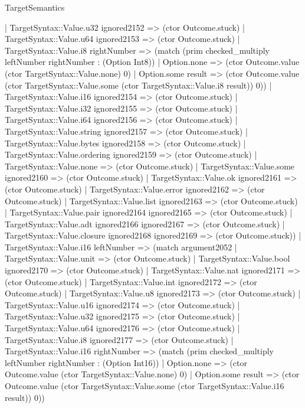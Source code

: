 \begin{lexlean}{TargetSemantics}
\begin{semanticmodule}
{              | TargetSyntax::Value.u32 ignored2152 => (ctor Outcome.stuck)
              | TargetSyntax::Value.u64 ignored2153 => (ctor Outcome.stuck)
              | TargetSyntax::Value.i8 rightNumber => (match (prim checked_multiply leftNumber rightNumber : (Option Int8))
                | Option.none => (ctor Outcome.value (ctor TargetSyntax::Value.none) 0)
                | Option.some result => (ctor Outcome.value (ctor TargetSyntax::Value.some (ctor TargetSyntax::Value.i8 result)) 0))
              | TargetSyntax::Value.i16 ignored2154 => (ctor Outcome.stuck)
              | TargetSyntax::Value.i32 ignored2155 => (ctor Outcome.stuck)
              | TargetSyntax::Value.i64 ignored2156 => (ctor Outcome.stuck)
              | TargetSyntax::Value.string ignored2157 => (ctor Outcome.stuck)
              | TargetSyntax::Value.bytes ignored2158 => (ctor Outcome.stuck)
              | TargetSyntax::Value.ordering ignored2159 => (ctor Outcome.stuck)
              | TargetSyntax::Value.none => (ctor Outcome.stuck)
              | TargetSyntax::Value.some ignored2160 => (ctor Outcome.stuck)
              | TargetSyntax::Value.ok ignored2161 => (ctor Outcome.stuck)
              | TargetSyntax::Value.error ignored2162 => (ctor Outcome.stuck)
              | TargetSyntax::Value.list ignored2163 => (ctor Outcome.stuck)
              | TargetSyntax::Value.pair ignored2164 ignored2165 => (ctor Outcome.stuck)
              | TargetSyntax::Value.adt ignored2166 ignored2167 => (ctor Outcome.stuck)
              | TargetSyntax::Value.closure ignored2168 ignored2169 => (ctor Outcome.stuck))
            | TargetSyntax::Value.i16 leftNumber => (match argument2052
              | TargetSyntax::Value.unit => (ctor Outcome.stuck)
              | TargetSyntax::Value.bool ignored2170 => (ctor Outcome.stuck)
              | TargetSyntax::Value.nat ignored2171 => (ctor Outcome.stuck)
              | TargetSyntax::Value.int ignored2172 => (ctor Outcome.stuck)
              | TargetSyntax::Value.u8 ignored2173 => (ctor Outcome.stuck)
              | TargetSyntax::Value.u16 ignored2174 => (ctor Outcome.stuck)
              | TargetSyntax::Value.u32 ignored2175 => (ctor Outcome.stuck)
              | TargetSyntax::Value.u64 ignored2176 => (ctor Outcome.stuck)
              | TargetSyntax::Value.i8 ignored2177 => (ctor Outcome.stuck)
              | TargetSyntax::Value.i16 rightNumber => (match (prim checked_multiply leftNumber rightNumber : (Option Int16))
                | Option.none => (ctor Outcome.value (ctor TargetSyntax::Value.none) 0)
                | Option.some result => (ctor Outcome.value (ctor TargetSyntax::Value.some (ctor TargetSyntax::Value.i16 result)) 0))
}
\end{semanticmodule}
\end{lexlean}

